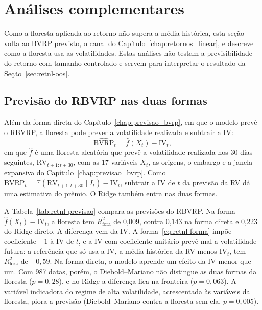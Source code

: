\section{Análises complementares}
\label{sec:retnl-complementares}

Como a floresta aplicada ao retorno não supera a média histórica, esta seção
volta ao BVRP previsto, o canal do Capítulo~\ref{chap:retornos_linear}, e
descreve como a floresta usa as volatilidades. Estas análises não testam a previsibilidade do retorno
com tamanho controlado e servem para interpretar o resultado da
Seção~\ref{sec:retnl-oos}.

\subsection{Previsão do RBVRP nas duas formas}
\label{sec:retnl-previsao}

Além da forma direta do Capítulo~\ref{chap:previsao_bvrp}, em que o modelo
prevê o RBVRP, a floresta pode prever a volatilidade realizada e subtrair a
IV:
\begin{equation}
\widehat{\text{BVRP}}_t = \hat f(X_t) - \text{IV}_t,
\label{eq:retnl-forma}
\end{equation}
em que $\hat f$ é uma floresta aleatória que prevê a volatilidade realizada nos
30 dias seguintes, $\text{RV}_{t+1:t+30}$, com as 17 variáveis $X_t$, as
origens, o embargo e a janela expansiva do Capítulo~\ref{chap:previsao_bvrp}.
Como $\text{BVRP}_t = \mathbb{E}(\text{RV}_{t+1:t+30} \mid I_t) - \text{IV}_t$,
subtrair a IV de $t$ da previsão da RV dá uma estimativa do prêmio.
O Ridge também entra nas duas formas.

A Tabela~\ref{tab:retnl-previsao} compara as previsões do RBVRP. Na forma
$\hat f(X_t) - \text{IV}_t$, a floresta tem $R^2_{\text{fora}}$ de 0,009,
contra 0,143 na forma direta e 0,223 do Ridge direto. A diferença vem da IV. A
forma~\eqref{eq:retnl-forma} impõe coeficiente $-1$ à IV de $t$, e a IV com
coeficiente unitário prevê mal a volatilidade futura: a referência que só usa
a IV, a média histórica da RV menos $\text{IV}_t$, tem $R^2_{\text{fora}}$ de
$-0{,}59$. Na forma direta, o modelo aprende um efeito da IV menor que um. Com
987 datas, porém, o Diebold--Mariano não distingue as duas formas da floresta
($p = 0{,}28$), e no Ridge a diferença fica na fronteira ($p = 0{,}063$). A
variável indicadora do regime de alta volatilidade, acrescentada às
variáveis da floresta, piora a previsão (Diebold--Mariano contra a floresta
sem ela, $p = 0{,}005$).

